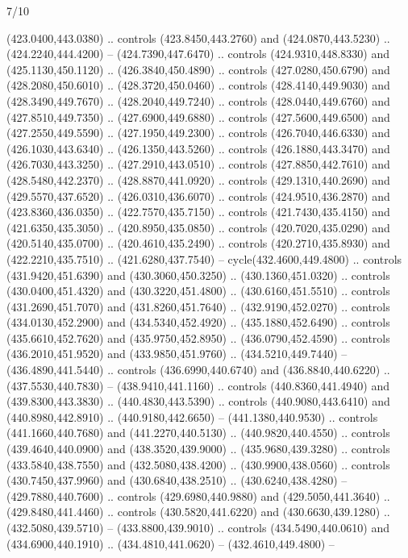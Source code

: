 \begin{flagdescription}{7/10}
\begin{scope}[xshift=0.5\flaglength]
\begin{scope}[scale=0.00185\flagwidth,yshift=245mm,xshift=-43.7mm]
\begin{scope}[y=-0.8pt, x=0.8pt, inner sep=0pt, outer sep=0pt]
\begin{scope}[shift={(-344.0678,183.89831)},fill=brown]
  (423.0400,443.0380) .. controls (423.8450,443.2760) and (424.0870,443.5230) ..
  (424.2240,444.4200) -- (424.7390,447.6470) .. controls (424.9310,448.8330) and
  (425.1130,450.1120) .. (426.3840,450.4890) .. controls (427.0280,450.6790) and
  (428.2080,450.6010) .. (428.3720,450.0460) .. controls (428.4140,449.9030) and
  (428.3490,449.7670) .. (428.2040,449.7240) .. controls (428.0440,449.6760) and
  (427.8510,449.7350) .. (427.6900,449.6880) .. controls (427.5600,449.6500) and
  (427.2550,449.5590) .. (427.1950,449.2300) .. controls (426.7040,446.6330) and
  (426.1030,443.6340) .. (426.1350,443.5260) .. controls (426.1880,443.3470) and
  (426.7030,443.3250) .. (427.2910,443.0510) .. controls (427.8850,442.7610) and
  (428.5480,442.2370) .. (428.8870,441.0920) .. controls (429.1310,440.2690) and
  (429.5570,437.6520) .. (426.0310,436.6070) .. controls (424.9510,436.2870) and
  (423.8360,436.0350) .. (422.7570,435.7150) .. controls (421.7430,435.4150) and
  (421.6350,435.3050) .. (420.8950,435.0850) .. controls (420.7020,435.0290) and
  (420.5140,435.0700) .. (420.4610,435.2490) .. controls (420.2710,435.8930) and
  (422.2210,435.7510) .. (421.6280,437.7540) -- cycle(432.4600,449.4800) ..
  controls (431.9420,451.6390) and (430.3060,450.3250) .. (430.1360,451.0320) ..
  controls (430.0400,451.4320) and (430.3220,451.4800) .. (430.6160,451.5510) ..
  controls (431.2690,451.7070) and (431.8260,451.7640) .. (432.9190,452.0270) ..
  controls (434.0130,452.2900) and (434.5340,452.4920) .. (435.1880,452.6490) ..
  controls (435.6610,452.7620) and (435.9750,452.8950) .. (436.0790,452.4590) ..
  controls (436.2010,451.9520) and (433.9850,451.9760) .. (434.5210,449.7440) --
  (436.4890,441.5440) .. controls (436.6990,440.6740) and (436.8840,440.6220) ..
  (437.5530,440.7830) -- (438.9410,441.1160) .. controls (440.8360,441.4940) and
  (439.8300,443.3830) .. (440.4830,443.5390) .. controls (440.9080,443.6410) and
  (440.8980,442.8910) .. (440.9180,442.6650) -- (441.1380,440.9530) .. controls
  (441.1660,440.7680) and (441.2270,440.5130) .. (440.9820,440.4550) .. controls
  (439.4640,440.0900) and (438.3520,439.9000) .. (435.9680,439.3280) .. controls
  (433.5840,438.7550) and (432.5080,438.4200) .. (430.9900,438.0560) .. controls
  (430.7450,437.9960) and (430.6840,438.2510) .. (430.6240,438.4280) --
  (429.7880,440.7600) .. controls (429.6980,440.9880) and (429.5050,441.3640) ..
  (429.8480,441.4460) .. controls (430.5820,441.6220) and (430.6630,439.1280) ..
  (432.5080,439.5710) -- (433.8800,439.9010) .. controls (434.5490,440.0610) and
  (434.6900,440.1910) .. (434.4810,441.0620) -- (432.4610,449.4800) --

\end{scope}
\end{scope}
\end{scope}
\end{scope}
\end{flagdescription}
